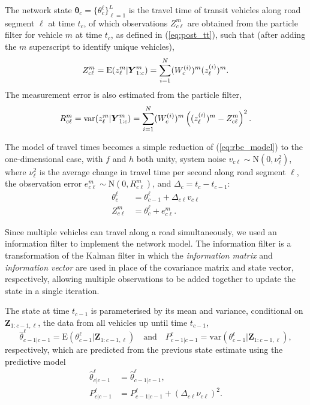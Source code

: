 The network state $\boldsymbol\theta_c = \{\theta_c^\ell\}_{\ell = 1}^L$ is the travel time
of transit vehicles along road segment $\ell$ at time $t_c$,
of which observations $Z_{c\ell}^{m}$
are obtained from the particle filter for vehicle $m$ at time $t_c$,
as defined in (\ref{eq:post_tt}), such that
(after adding the $m$ superscript to identify unique vehicles),
\begin{equation}
\label{eq:tt_obs_mean}
Z_{c\ell}^{m} = \mathrm{E}(z_{\ell}^{m} | \mbox{$\boldsymbol{Y}$}^m_{1:c}) =
\sum_{i=1}^N (W_c^{(i)})^m (z_\ell^{(i)})^{m}.
\end{equation}
The measurement error is also estimated from the particle filter,
\begin{equation}
\label{eq:tt_obs_err}
R_{c\ell}^m = \mathrm{var}(z_{\ell}^{m} | \mbox{$\boldsymbol{Y}$}^m_{1:c}) =
\sum_{i=1}^N (W_c^{(i)})^m \left((z_\ell^{(i)})^{m} - Z_{c\ell}^{m}\right)^2.
\end{equation}

The model of travel times becomes a simple reduction of (\ref{eq:rbe_model})
to the one-dimensional case,
with $f$ and $h$ both unity,
system noise $v_{c\ell} \sim \mathrm{N}(0, \nu_\ell^2)$,
where $\nu_\ell^2$ is the average change in travel time per second
along road segment $\ell$,
the observation error $e_{c\ell}^{m} \sim \mathrm{N}(0, R_{c\ell}^{m})$,
and $\Delta_c = t_c - t_{c-1}$:
\begin{equation*}
\begin{split}
\theta_c^\ell &= \theta_{c-1}^\ell + \Delta_{c\ell} v_{c\ell} \\
Z_{c\ell}^{m} &= \theta_c^\ell + e_{c\ell}^{m}.
\end{split}
\end{equation*}


Since multiple vehicles can travel along a road simultaneously,
we used an information filter to implement the network model.
The information filter is a transformation of the Kalman filter in which the
\emph{information matrix} and \emph{information vector} are used in place of
the covariance matrix and state vector, respectively,
allowing multiple observations to be added together to update the state
in a single iteration.


The state at time $t_{c-1}$ is parameterised by its mean and variance,
conditional on $\boldsymbol{Z}_{1:c-1,\ell}$,
the data from all vehicles up until time $t_{c-1}$,
\begin{equation*}
\hat \theta_{c-1|c-1}^\ell =
\mathrm{E}(\theta_{c-1}^\ell | \boldsymbol{Z}_{1:c-1,\ell})
\quad\text{and}\quad
P_{c-1|c-1}^\ell =
\mathrm{var}(\theta_{c-1}^\ell | \boldsymbol{Z}_{1:c-1,\ell}),
\end{equation*}
respectively,
which are predicted from the previous state estimate using the predictive model
\begin{align*}
\label{eq:kf_transition}
\hat \theta^\ell_{c|c-1} &= \hat \theta^\ell_{c-1|c-1}, \\
P^\ell_{c|c-1} &= P^\ell_{c-1|c-1} + (\Delta_{c\ell} \nu_{c\ell})^2.
\end{align*}

